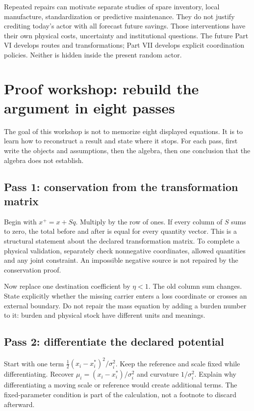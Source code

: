 Repeated repairs can motivate separate studies of spare inventory,
local manufacture, standardization or predictive maintenance. They do
not justify crediting today's actor with all forecast future savings.
Those interventions have their own physical costs, uncertainty and
institutional questions. The future Part VI develops routes and
transformations; Part VII develops explicit coordination policies.
Neither is hidden inside the present random actor.

\section{Proof workshop: rebuild the argument in eight passes}
The goal of this workshop is not to memorize eight displayed equations.
It is to learn how to reconstruct a result and state where it stops.
For each pass, first write the objects and assumptions, then the algebra,
then one conclusion that the algebra does not establish.

\subsection{Pass 1: conservation from the transformation matrix}
Begin with $x^+=x+Sq$. Multiply by the row of ones. If every column
of $S$ sums to zero, the total before and after is equal for every
quantity vector. This is a structural statement about the declared
transformation matrix. To complete a physical validation, separately
check nonnegative coordinates, allowed quantities and any joint constraint.
An impossible negative source is not repaired by the conservation proof.

Now replace one destination coefficient by $\eta<1$. The old
column sum changes. State explicitly whether the missing carrier enters
a loss coordinate or crosses an external boundary. Do not repair the
mass equation by adding a burden number to it: burden and physical
stock have different units and meanings.

\subsection{Pass 2: differentiate the declared potential}
Start with one term $\tfrac12(x_i-x_i^*)^2/\sigma_i^2$.
Keep the reference and scale fixed while differentiating. Recover
$\mu_i=(x_i-x_i^*)/\sigma_i^2$ and curvature
$1/\sigma_i^2$. Explain why differentiating a moving scale or
reference would create additional terms. The fixed-parameter condition
is part of the calculation, not a footnote to discard afterward.

